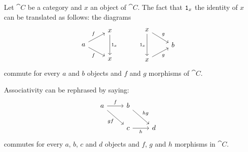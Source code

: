 \begin{example}
Let \(\cat C\) be a category and \(x\) an object of \(\cat C\). The fact that \(\mathtt 1_x\) the identity of \(x\) can be translated as follows: the diagrams
\begin{equation}\begin{tikzcd}[row sep=small]
 & x \ar["{\id_x}", dd] \\
a \ar["f", ur] \ar["f", dr, swap]  \\
  & x &
\end{tikzcd} \quad
\begin{tikzcd}[row sep=small]
x \ar["{\id_x}", dd, swap] \ar["g", dr] & \\
&  b \\
x \ar["g", ur, swap] &
\end{tikzcd}
\label{diag:IdPropDiag}\end{equation}
commute for every \(a\) and \(b\) objects and \(f\) and \(g\) morphisms of \(\cat C\).
\end{example}

\begin{example}
Associativity can be rephrased by saying:
\[\begin{tikzcd}
a \ar["f", r] \ar["{gf}", swap, dr] & b \ar["{hg}", dr] \\
& c \ar["h", swap, r] & d
\end{tikzcd}\]
commutes for every \(a\), \(b\), \(c\) and \(d\) objects and \(f\), \(g\) and \(h\) morphisms in \(\cat C\).
\end{example}


